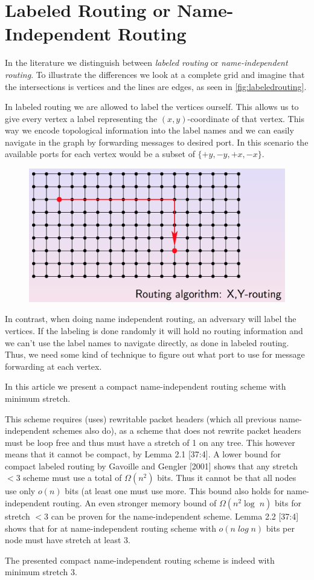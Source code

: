 \section*{Labeled Routing or Name-Independent Routing}
In the literature we distinguish between \emph{labeled routing} or
\emph{name-independent routing}. To illustrate the differences we look at a complete
grid and imagine that the intersections is vertices and the lines are edges, as seen in \autoref{fig:labeledrouting}.

In labeled routing we are allowed to label the vertices ourself. This allows
us to give every vertex a label representing the $(x,y)$-coordinate of that
vertex. This way we encode topological information into the label names and we
can easily navigate in the graph by forwarding messages to desired port. In
this scenario the available ports for each vertex would be a subset of $\{+y,
-y, +x, -x\}$.
\begin{figure}[htbp]
    \centering
    \includegraphics[scale=0.3]{images/xyrouting.png} 
    \label{fig:labeledrouting}
\end{figure}

In contrast, when doing name independent routing, an adversary will label the
vertices. If the labeling is done randomly it will hold no routing information
and we can't use the label names to navigate directly, as done in labeled routing. Thus, we need some kind of
technique to figure out what port to use for message forwarding at each vertex.

In this article we present a compact name-independent routing scheme with minimum stretch.

This scheme requires (uses) rewritable packet headers (which all previous name-independent schemes also do), as a scheme that does not rewrite packet headers must be loop free and thus must have a stretch of 1 on any tree. This however means that it cannot be compact, by Lemma 2.1 \cite{compactNameIndepRouting}[37:4]. A lower bound for compact labeled routing by Gavoille and Gengler [2001] shows that any stretch $< 3$ scheme must use a total of $\Omega(n^2)$ bits. Thus it cannot be that all nodes use only $o(n)$ bits (at least one must use more. This bound also holds for name-independent routing. An even stronger memory bound of $\Omega(n^2\log\;n)$ bits for stretch $< 3 $ can be proven for the name-independent scheme. Lemma 2.2 \cite{compactNameIndepRouting}[37:4] shows that for at name-independent routing scheme with $o(n\;log\;n)$ bits per node must have stretch at least 3.

The presented compact name-independent routing scheme is indeed with minimum stretch 3.